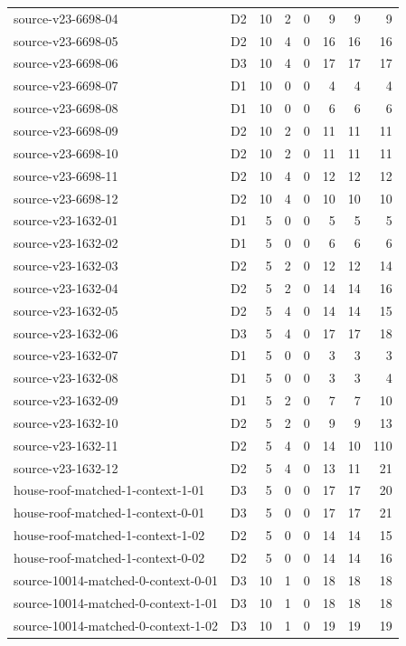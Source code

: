 \begin{longtable}{p{}lrrrrrr}
source-v23-6698-04 & D2 & 10 & 2 & 0 & 9 & 9 & 9\\
source-v23-6698-05 & D2 & 10 & 4 & 0 & 16 & 16 & 16\\
source-v23-6698-06 & D3 & 10 & 4 & 0 & 17 & 17 & 17\\
source-v23-6698-07 & D1 & 10 & 0 & 0 & 4 & 4 & 4\\
source-v23-6698-08 & D1 & 10 & 0 & 0 & 6 & 6 & 6\\
source-v23-6698-09 & D2 & 10 & 2 & 0 & 11 & 11 & 11\\
source-v23-6698-10 & D2 & 10 & 2 & 0 & 11 & 11 & 11\\
source-v23-6698-11 & D2 & 10 & 4 & 0 & 12 & 12 & 12\\
source-v23-6698-12 & D2 & 10 & 4 & 0 & 10 & 10 & 10\\
source-v23-1632-01 & D1 & 5 & 0 & 0 & 5 & 5 & 5\\
source-v23-1632-02 & D1 & 5 & 0 & 0 & 6 & 6 & 6\\
source-v23-1632-03 & D2 & 5 & 2 & 0 & 12 & 12 & 14\\
source-v23-1632-04 & D2 & 5 & 2 & 0 & 14 & 14 & 16\\
source-v23-1632-05 & D2 & 5 & 4 & 0 & 14 & 14 & 15\\
source-v23-1632-06 & D3 & 5 & 4 & 0 & 17 & 17 & 18\\
source-v23-1632-07 & D1 & 5 & 0 & 0 & 3 & 3 & 3\\
source-v23-1632-08 & D1 & 5 & 0 & 0 & 3 & 3 & 4\\
source-v23-1632-09 & D1 & 5 & 2 & 0 & 7 & 7 & 10\\
source-v23-1632-10 & D2 & 5 & 2 & 0 & 9 & 9 & 13\\
source-v23-1632-11 & D2 & 5 & 4 & 0 & 14 & 10 & 110\\
source-v23-1632-12 & D2 & 5 & 4 & 0 & 13 & 11 & 21\\
house-roof-matched-1-context-1-01 & D3 & 5 & 0 & 0 & 17 & 17 & 20\\
house-roof-matched-1-context-0-01 & D3 & 5 & 0 & 0 & 17 & 17 & 21\\
house-roof-matched-1-context-1-02 & D2 & 5 & 0 & 0 & 14 & 14 & 15\\
house-roof-matched-1-context-0-02 & D2 & 5 & 0 & 0 & 14 & 14 & 16\\
source-10014-matched-0-context-0-01 & D3 & 10 & 1 & 0 & 18 & 18 & 18\\
source-10014-matched-0-context-1-01 & D3 & 10 & 1 & 0 & 18 & 18 & 18\\
source-10014-matched-0-context-1-02 & D3 & 10 & 1 & 0 & 19 & 19 & 19\\

\end{longtable}
